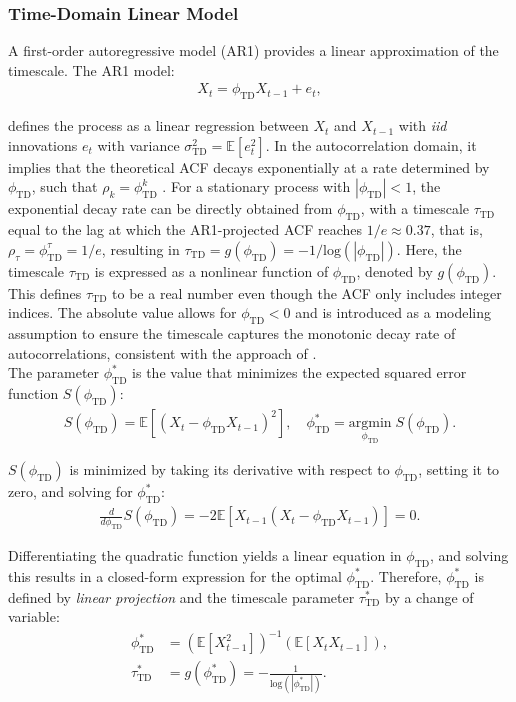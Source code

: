 \documentclass[9pt]{article}
\newcommand{\phitd}{\phi_{\scriptscriptstyle\text{TD}}}
\newcommand{\tautd}{\tau_{\scriptscriptstyle\text{TD}}}
\newcommand{\sigmatd}{\sigma_{\scriptscriptstyle\text{TD}}}
\begin{document}
\subsubsection{Time-Domain Linear Model}\label{sec:time-domain-linear-model}
A first-order autoregressive model (AR1) provides a linear approximation of the timescale. The AR1 model:
\begin{align}\label{eq:ar1}
    X_t = \phitd X_{t-1} + e_t,
\end{align}

\noindent defines the process as a linear regression between $X_t$ and $X_{t-1}$ with \textit{iid} innovations $e_t$ with variance $\sigmatd^2 = \mathbb{E}[e_t^2]$. In the autocorrelation domain, it implies that the theoretical ACF decays exponentially at a rate determined by $\phitd$, such that $\rho_k = \phitd^k$ \citep[Chapter~14.22]{hansen_econometrics_2022}. For a stationary process with $|\phitd|<1$, the exponential decay rate can be directly obtained from $\phitd$, with a timescale $\tautd$ equal to the lag at which the AR1-projected ACF reaches $1/e\approx 0.37$, that is,  $\rho_\tau = \phitd^\tau = 1/e$, resulting in $\tautd = g(\phitd) = -1/\text{log}(|\phitd|)$. Here, the timescale $\tautd$ is expressed as a nonlinear function of $\phitd$, denoted by $g(\phitd)$. This defines $\tautd$ to be a real number even though the ACF only includes integer indices. The absolute value allows for $\phitd<0$ and is introduced as a modeling assumption to ensure the timescale captures the monotonic decay rate of autocorrelations, consistent with the approach of \citet{murray_hierarchy_2014}.\\

The parameter $\phitd^*$ is the value that minimizes the expected squared error function $S(\phitd)$:
\begin{align}
    S(\phitd) = \mathbb{E}[(X_t - \phitd X_{t-1})^2],\quad \phitd^* = \underset{\phitd}{\text{argmin}} \; S(\phitd).
\end{align}

\noindent $S(\phitd)$ is minimized by taking its derivative with respect to $\phitd$, setting it to zero, and solving for $\phitd^*$:
\begin{align}
    \frac{d}{d\phitd} S(\phitd) = -2 \mathbb{E}[X_{t-1}(X_t - \phitd X_{t-1})] = 0.
\end{align}

\noindent Differentiating the quadratic function yields a linear equation in $\phitd$, and solving this results in a closed-form expression for the optimal $\phitd^*$. Therefore, $\phitd^*$ is defined by \textit{linear projection} and the timescale parameter $\tautd^*$ by a change of variable:
\begin{align}
    \phitd^* &= (\mathbb{E}[X_{t-1}^2])^{-1}(\mathbb{E}[X_t X_{t-1}]) \label{eq:ar1-phi},\\
    \tautd^* &= g(\phitd^*) = -\frac{1}{\text{log}(|\phitd^*|)}. \label{eq:ar1-tau}
\end{align}
\end{document}

